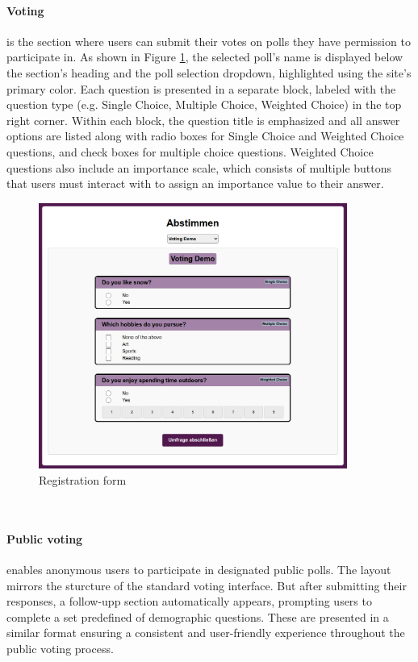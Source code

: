 \documentclass[a4paper,12pt]{report}
\begin{document}
\paragraph{Voting} is the section where users can submit their votes on polls they have permission to participate in. As shown in Figure \ref{fig:voting_view}, the selected poll's name is displayed below the section's heading and the poll selection dropdown, highlighted using the site's primary color. Each question is presented in a separate block, labeled with the question type (e.g. Single Choice, Multiple Choice, Weighted Choice) in the top right corner. Within each block, the question title is emphasized and all answer options are listed along with radio boxes for Single Choice and Weighted Choice questions, and check boxes for multiple choice questions. Weighted Choice questions also include an importance scale, which consists of multiple buttons that users must interact with to assign an importance value to their answer.
\begin{figure}[H]
	\centering
	\includegraphics[width=0.9\textwidth]{pics/voting_view.png}
	\caption{Registration form}
	\label{fig:voting_view}
\end{figure}
\\
\paragraph{Public voting} enables anonymous users to participate in designated public polls. The layout mirrors the sturcture of the standard voting interface. But after submitting their responses, a follow-upp section automatically appears, prompting users to complete a set predefined of demographic questions. These are presented in a similar format ensuring a consistent and user-friendly experience throughout the public voting process.\\\\
\end{document}
